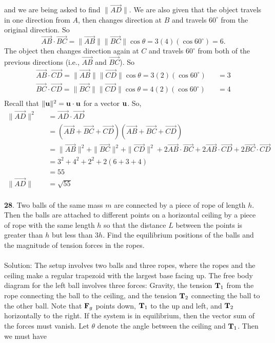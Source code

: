 \documentclass[12pt]{amsbook}
\begin{document}
and we are being asked to find $\|\overrightarrow{AD}\|$. We are also given that the object travels in one direction from $A$, then changes direction at $B$ and travels $60^\circ$ from the original direction. So $$\overrightarrow{AB}\cdot\overrightarrow{BC}=\|\overrightarrow{AB}\|\|\overrightarrow{BC}\|\cos\theta=3(4)(\cos60^\circ)=6.$$
The object then changes direction again at $C$ and travels $60^\circ$ from both of the previous directions (i.e., $\overrightarrow{AB}$ and $\overrightarrow{BC}$). So
\begin{eqnarray*}
\overrightarrow{AB}\cdot\overrightarrow{CD}=\|\overrightarrow{AB}\|\|\overrightarrow{CD}\|\cos\theta=3(2)(\cos60^\circ)&&=3\\
\overrightarrow{BC}\cdot\overrightarrow{CD}=\|\overrightarrow{BC}\|\|\overrightarrow{CD}\|\cos\theta=4(2)(\cos60^\circ)&&=4\\
\end{eqnarray*}
Recall that $\|{\bf u}\|^2=\bf u \cdot \bf u$ for a vector $\bf u$. So,
\begin{eqnarray*}
\|\overrightarrow{AD}\|^2&&=\overrightarrow{AD}\cdot \overrightarrow{AD}\\
&&=(\overrightarrow{AB}+\overrightarrow{BC}+\overrightarrow{CD})(\overrightarrow{AB}+\overrightarrow{BC}+\overrightarrow{CD})\\
&&=\|\overrightarrow{AB}\|^2+\|\overrightarrow{BC}\|^2+\|\overrightarrow{CD}\|^2+2\overrightarrow{AB}\cdot\overrightarrow{BC}+2\overrightarrow{AB}\cdot\overrightarrow{CD}+2\overrightarrow{BC}\cdot\overrightarrow{CD}\\
&&=3^2+4^2+2^2+2(6+3+4)\\
&&=55\\
\|\overrightarrow{AD}\|&&=\sqrt{55}
\end{eqnarray*}
\\
{\small\bf 28}. Two balls of the same mass $m$ are
connected by a piece of rope of length $h$. Then the balls are
attached to  different points on a horizontal ceiling by a piece
of rope with the same length $h$ so that the distance $L$ between
the points is greater than $h$ but less than $3h$. Find the
equilibrium positions of the balls and the magnitude of 
tension forces in the ropes.\\
\\
{\sc Solution}:
The setup involves two balls and three ropes, where the ropes and the ceiling make a regular trapezoid with the largest base facing up. The free body diagram for the left ball involves three forces: Gravity, the tension ${\bf T}_1$ from the rope connecting the ball to the ceiling, and the tension ${\bf T}_2$ connecting the ball to the other ball. Note that ${\bf F}_g$ points down, ${\bf T}_1$ to the up and left, and ${\bf T}_2$ horizontally to the right. If the system is in equilibrium, then the vector sum of the forces must vanish. Let $\theta$ denote the angle between the ceiling and ${\bf T}_1$. Then we must have
\end{document}
